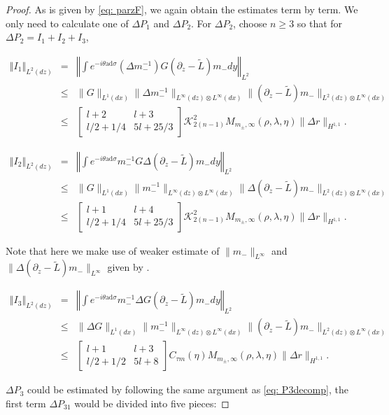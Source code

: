 \documentclass{amsart}
\theoremstyle{plain}
\theoremstyle{remark}
\numberwithin{equation}{section}
\newcommand{\norm}[2]{\left\Vert #1\right\Vert_{#2}}
\newcommand{\Twomat}[4]
{
\left[
	\begin{array}{cc}
		{#1}	&	{#2}	\\[10pt]
		{#3}	&	{#4}
		\end{array}
\right]
}
\begin{document}
\begin{proof}
    As is given by \eqref{eq: parzF}, we again obtain the estimates term by term. We only need to calculate one of $\Delta P_1$ and $\Delta P_2$. For $\Delta P_2$, choose $n\geq 3$ so that for ${\Delta P_2}= { I_1} +{ I_2}+ { I_3}$,

    \begin{eqnarray*}
        \norm{I_1}{L^2 (dz)} & =& \left\Vert \int e^{-i\theta \mathrm{ad} \sigma}(\Delta m_-^{-1})G(\partial_z - \tilde{L})m_- dy\right\Vert_{L^2}\\
        &\leq & \|G\|_{L^1(dx)}\|\Delta m_-^{-1}\|_{L^{\infty}(dz)\otimes L^{\infty}(dx)} \| (\partial_z - \tilde{L})m_-\|_{L^2(dz)\otimes L^\infty(dx)}\\
        &\leq& \Twomat{l+2}{l+3}{l/2+1/4}{5l+25/3}\mathcal{K}_{2(n-1)}^2M_{m_{\pm},\infty}(\rho,\lambda, \eta)\|\Delta r\|_{H^{1,1}}.
    \end{eqnarray*}

    \begin{eqnarray*}
        \norm{I_2}{L^2 (dz)} & =& \left\Vert \int e^{-i\theta \mathrm{ad} \sigma}m_-^{-1}G\Delta(\partial_z - \tilde{L})m_- dy\right\Vert_{L^2}\\
        &\leq & \|G\|_{L^1(dx)}\|m_-^{-1}\|_{L^{\infty}(dz)\otimes L^{\infty}(dx)} \|\Delta (\partial_z - \tilde{L})m_-\|_{L^2(dz)\otimes L^\infty(dx)}\\
        &\leq& \Twomat{l+1}{l+4}{l/2+1/4}{5l+25/3}\mathcal{K}_{2(n-1)}^2M_{m_{\pm},\infty}(\rho,\lambda, \eta)\|\Delta r\|_{H^{1,1}}.
    \end{eqnarray*}

   Note that here we make use of weaker estimate of $\|m_-\|_{L^\infty}$ and $\|\Delta(\partial_z - \tilde{L})m_-\|_{L^\infty}$ given by  \cite[Lemma 5.12, Lemma 5.23]{DZ-2}. 

    \begin{eqnarray*}
       \norm{I_3}{L^2 (dz)}& =& \left\Vert \int e^{-i\theta \mathrm{ad} \sigma}m_-^{-1}\Delta G (\partial_z - \tilde{L})m_- dy\right\Vert_{L^2}\\
        &\leq & \|\Delta G\|_{L^1(dx)}\|m_-^{-1}\|_{L^{\infty}(dz)\otimes L^{\infty}(dx)} \|(\partial_z - \tilde{L})m_-\|_{L^2(dz)\otimes L^\infty(dx)}\\
        &\leq& \Twomat{l+1}{l+3}{l/2+1/2}{5l+8}C_{\tau m}(\eta)M_{m_{\pm},\infty}(\rho,\lambda, \eta)\|\Delta r\|_{H^{1,1}}.
    \end{eqnarray*}

    $\Delta P_3$ could be estimated by following the same argument as \eqref{eq: P3decomp}, the first term $\Delta P_{31}$ would be divided into five pieces:


\end{proof}
\end{document}
